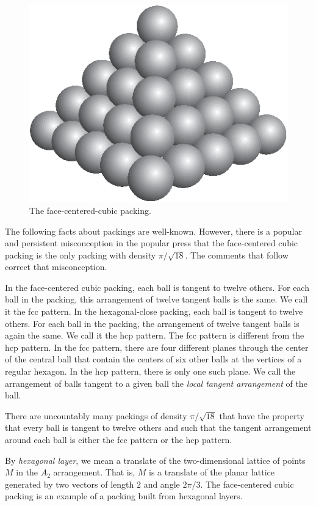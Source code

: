\begin{figure}[htb]
  \centering
  \includegraphics{PS/fcc_small.eps}
  \caption{The face-centered-cubic packing.}
  \label{fig:fcc-pack}
\end{figure}

The following facts about packings are well-known.  However, there
is a popular and persistent misconception in the popular press
that the face-centered cubic packing is the only packing with
density $\pi/\sqrt{18}$. The comments that follow correct that
misconception.

In the face-centered cubic packing, each ball is tangent to twelve
others.  For each ball in the packing, this arrangement of twelve
tangent balls is the same.  We call it the fcc pattern. In the
hexagonal-close packing, each ball is tangent to twelve others.
For each ball in the packing, the arrangement of twelve tangent
balls is again the same.  We call it the hcp pattern.  The fcc
pattern is different from the hcp pattern.  In the fcc pattern,
there are four different planes through the center of the central
ball that contain the centers of six other balls at the vertices
of a regular hexagon.  In the hcp pattern, there is only one such
plane.  We call the arrangement of balls tangent to a given ball
the {\it local tangent arrangement} of the ball.

There are uncountably many packings of density $\pi/\sqrt{18}$
that have the property that every ball is tangent to twelve others
and such that the tangent arrangement around each ball is either
the fcc pattern or the hcp pattern.

By {\it hexagonal layer}, we mean a translate of the two-dimensional
lattice of points $M$ in the $A_2$ arrangement. That is, $M$ is a
translate of the planar lattice generated by two vectors of length
$2$ and angle $2\pi/3$.  The face-centered cubic packing is an
example of a packing built from hexagonal layers.

